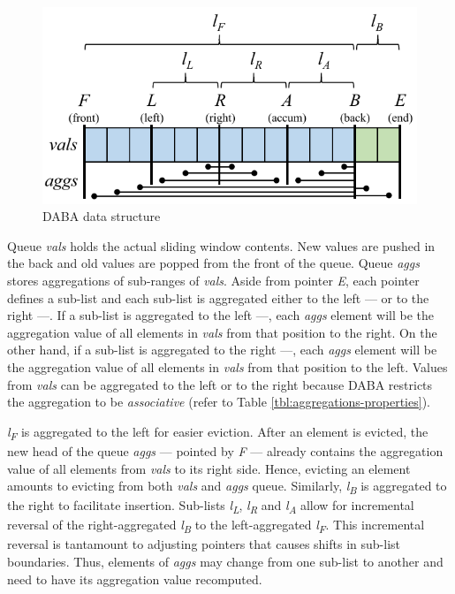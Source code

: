 \begin{figure}[!htb]
    \begin{center}
      \includegraphics[scale=0.6]{figures/daba-ds.png}
      \caption{DABA data structure}
      \label{fig:daba-ds}
    \end{center}
\end{figure}

Queue \textit{vals} holds the actual sliding window contents. New values are pushed in the back and old values are popped from the front of the queue. Queue \textit{aggs} stores aggregations of sub-ranges of \textit{vals}. Aside from pointer \textit{E}, each pointer defines a sub-list and each sub-list is aggregated either to the left \textbullet--- or to the right ---\textbullet. If a sub-list is aggregated to the left \textbullet---, each \textit{aggs} element will be the aggregation value of all elements in \textit{vals} from that position to the right. On the other hand, if a sub-list is aggregated to the right ---\textbullet, each \textit{aggs} element will be the aggregation value of all elements in \textit{vals} from that position to the left. Values from \textit{vals} can be aggregated to the left or to the right because DABA restricts the aggregation to be \textit{associative} (refer to Table \ref{tbl:aggregations-properties}).

\textit{l\textsubscript{F}} is aggregated to the left for easier eviction. After an element is evicted, the new head of the queue \textit{aggs} --- pointed by \textit{F} --- already contains the aggregation value of all elements from \textit{vals} to its right side. Hence, evicting an element amounts to evicting from both \textit{vals} and \textit{aggs} queue. Similarly, \textit{l\textsubscript{B}} is aggregated to the right to facilitate insertion. Sub-lists \textit{l\textsubscript{L}}, \textit{l\textsubscript{R}} and \textit{l\textsubscript{A}} allow for incremental reversal of the right-aggregated \textit{l\textsubscript{B}} to the left-aggregated \textit{l\textsubscript{F}}. This incremental reversal is tantamount to adjusting pointers that causes shifts in sub-list boundaries. Thus, elements of \textit{aggs} may change from one sub-list to another and need to have its aggregation value recomputed.

